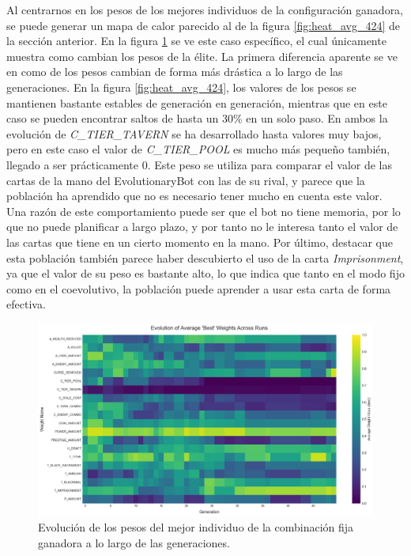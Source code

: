 Al centrarnos en los pesos de los mejores individuos de la configuración ganadora, se puede generar un mapa de calor parecido al de la figura \ref{fig:heat_avg_424} de la sección anterior. En la figura \ref{fig:fixed_heat_best} se ve este caso específico, el cual únicamente muestra como cambian los pesos de la élite. La primera diferencia aparente se ve en como de los pesos cambian de forma más drástica a lo largo de las generaciones. En la figura \ref{fig:heat_avg_424}, los valores de los pesos se mantienen bastante estables de generación en generación, mientras que en este caso se pueden encontrar saltos de hasta un 30\% en un solo paso. En ambos la evolución de \textit{C\_TIER\_TAVERN} se ha desarrollado hasta valores muy bajos, pero en este caso el valor de \textit{C\_TIER\_POOL} es mucho más pequeño también, llegado a ser prácticamente 0. Este peso se utiliza para comparar el valor de las cartas de la mano del EvolutionaryBot con las de su rival, y parece que la población ha aprendido que no es necesario tener mucho en cuenta este valor. Una razón de este comportamiento puede ser que el bot no tiene memoria, por lo que no puede planificar a largo plazo, y por tanto no le interesa tanto el valor de las cartas que tiene en un cierto momento en la mano. Por último, destacar que esta población también parece haber descubierto el uso de la carta \textit{Imprisonment}, ya que el valor de su peso es bastante alto, lo que indica que tanto en el modo fijo como en el coevolutivo, la población puede aprender a usar esta carta de forma efectiva.

\begin{figure}[H]
	\centering
	\includegraphics[width=1.0\textwidth]{img/fixed_heat_best.png}
	\caption{Evolución de los pesos del mejor individuo de la combinación fija ganadora a lo largo de las generaciones.}
	\label{fig:fixed_heat_best}
\end{figure}

